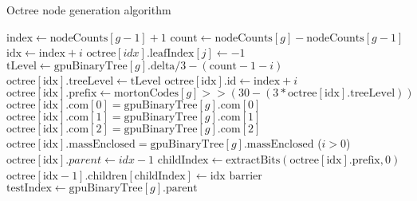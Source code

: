 \documentclass{thesis}
\begin{document}
\begin{algorithm}
    \label{alg:GenerateOctreeNodes}
    \caption{Octree node generation algorithm}
    \begin{algorithmic}
                \State $\text{index} \gets \text{nodeCounts}[g - 1] + 1$
                \State $\text{count} \gets \text{nodeCounts}[g] - \text{nodeCounts}[g-1]$
                        \State $\text{idx} \gets \text{index} + i$
                            \State $\text{octree}[idx].\text{leafIndex}[j] \gets -1$    
                        \EndFor
                        \State $\text{tLevel} \gets \text{gpuBinaryTree}[g].\text{delta}/3 - (\text{count} - 1 - i)$
                        \State $\text{octree}[\text{idx}].\text{treeLevel} \gets \text{tLevel}$
                        \State $\text{octree}[\text{idx}].\text{id} \gets \text{index} + i$
                        \State $\text{octree}[\text{idx}].\text{prefix} \gets \text{mortonCodes}[g] >> (30 - (3 * \text{octree}[\text{idx}].\text{treeLevel}))$
                        \State $\text{octree}[\text{idx}].\text{com}[0] = \text{gpuBinaryTree}[g].\text{com}[0]$
                        \State $\text{octree}[\text{idx}].\text{com}[1] = \text{gpuBinaryTree}[g].\text{com}[1]$
                        \State $\text{octree}[\text{idx}].\text{com}[2] = \text{gpuBinaryTree}[g].\text{com}[2]$
                        \State $\text{octree}[\text{idx}].\text{massEnclosed} = \text{gpuBinaryTree}[g].\text{massEnclosed}$
                        \If($i > 0$)
                            \State $\text{octree}[\text{idx}].parent \gets idx - 1$
                            \State $\text{childIndex} \gets \text{extractBits}(\text{octree}[\text{idx}].\text{prefix}, 0)$
                            \State $\text{octree}[\text{idx} - 1].\text{children}[\text{childIndex}] \gets \text{idx}$
                        \EndIf
                    \EndFor
                \EndIf
                \State $\text{barrier}$
                    \State $\text{testIndex} \gets \text{gpuBinaryTree}[g].\text{parent}$

\end{algorithmic}
\end{algorithm}
\end{document}
